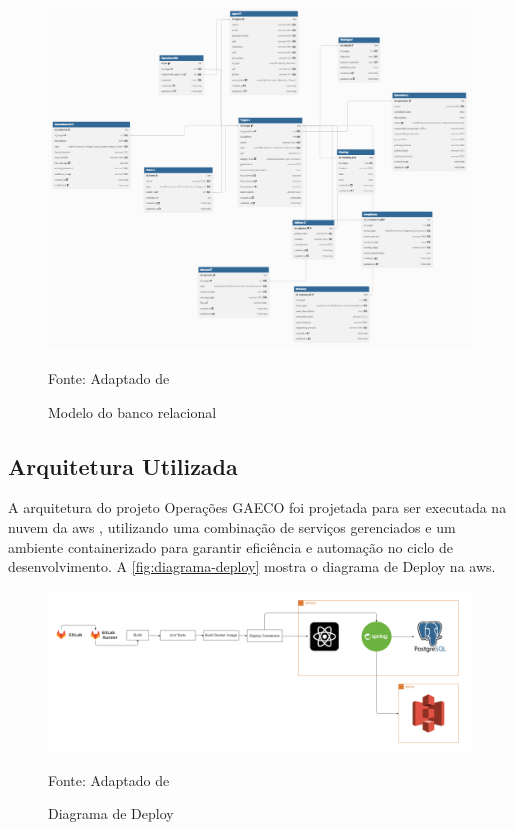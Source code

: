   \begin{figure}[H]
    \centering
    \small
    \includegraphics[width=1\linewidth]{conteudo//2 - ages I//conteudo//figures//banco_de_dados.png}
    \caption{Modelo do banco relacional}
    Fonte: Adaptado de \textcites{wiki-vincula}
    \label{fig:modelo-banco}
  \end{figure}

\newpage
\subsection{Arquitetura Utilizada}
  A arquitetura do projeto Operações GAECO foi projetada para ser executada na nuvem da \ac{aws} \cite{aws}, utilizando uma combinação de serviços gerenciados e um ambiente containerizado para garantir eficiência e automação no ciclo de desenvolvimento. A \autoref{fig:diagrama-deploy} mostra o diagrama de Deploy na \acs{aws}.

  \begin{figure}[H]
    \centering
    \small
    \includegraphics[width=1\linewidth]{conteudo//2 - ages I//conteudo//figures//Diagrama_de_Deploy.png}
    \caption{Diagrama de Deploy}
    Fonte: Adaptado de \textcites{wiki-Operacoes GAECO}
    \label{fig:diagrama-deploy}
  \end{figure}

